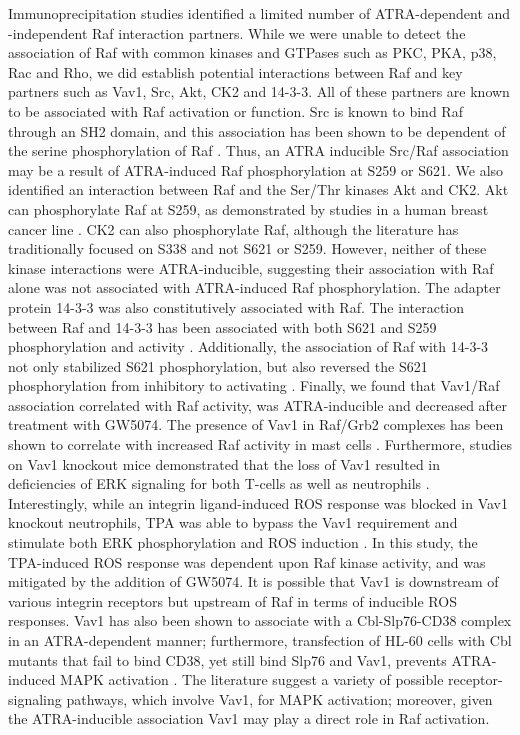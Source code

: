 \documentclass[12pt]{article}
\begin{document}
Immunoprecipitation studies identified a limited number of ATRA-dependent and -independent Raf interaction partners.
While we were unable to detect the association of Raf with common kinases and GTPases such as PKC, PKA, p38, Rac and Rho,
we did establish potential interactions between Raf and key partners such as Vav1, Src, Akt, CK2 and 14-3-3.
All of these partners are known to be associated with Raf activation or function.
Src is known to bind Raf through an SH2 domain, and this association has been shown to be dependent of the serine phosphorylation of Raf \cite{Cleghon1994}.
Thus, an ATRA inducible Src/Raf association may be a result of ATRA-induced Raf phosphorylation at S259 or S621.
We also identified an interaction between Raf and the Ser/Thr kinases Akt and CK2.
Akt can phosphorylate Raf at S259, as demonstrated by studies in a human breast cancer line \cite{Zimmermann1999}.
CK2 can also phosphorylate Raf, although the literature has traditionally focused on S338 and not S621 or S259\cite{Ritt2007}.
However, neither of these kinase interactions were ATRA-inducible, suggesting their association with Raf alone was not associated with ATRA-induced Raf phosphorylation.
The adapter protein 14-3-3 was also constitutively associated with Raf.
The interaction between Raf and 14-3-3 has been associated with both S621 and S259 phosphorylation and activity \cite{Hekman2004}.
Additionally, the association of Raf with 14-3-3 not only stabilized S621 phosphorylation,
but also reversed the S621 phosphorylation from inhibitory to activating \cite{Dhillon2009}.
Finally, we found that Vav1/Raf association correlated with Raf activity, was ATRA-inducible and decreased after treatment with GW5074.
The presence of Vav1 in Raf/Grb2 complexes has been shown to correlate with increased Raf activity in mast cells \cite{Song1996}.
Furthermore, studies on Vav1 knockout mice demonstrated that the loss of Vav1 resulted in deficiencies
of ERK signaling for both T-cells as well as neutrophils \cite{Costello1999,Graham2007}.
Interestingly, while an integrin ligand-induced ROS response was blocked in Vav1 knockout neutrophils, TPA was able to bypass the Vav1 requirement and stimulate both ERK phosphorylation
and ROS induction \cite{Graham2007}.
In this study, the TPA-induced ROS response was dependent upon Raf kinase activity, and was mitigated by the addition of GW5074.
It is possible that Vav1 is downstream of various integrin receptors but upstream of Raf in terms of inducible ROS responses.
Vav1 has also been shown to associate with a Cbl-Slp76-CD38 complex in an ATRA-dependent manner;
furthermore, transfection of HL-60 cells with Cbl mutants that fail to bind CD38, yet still bind Slp76 and Vav1, prevents
ATRA-induced MAPK activation \cite{Shen2009}.
The literature suggest a variety of possible receptor-signaling pathways, which involve Vav1, for MAPK activation; moreover,
given the ATRA-inducible association Vav1 may play a direct role in Raf activation.
\end{document}
